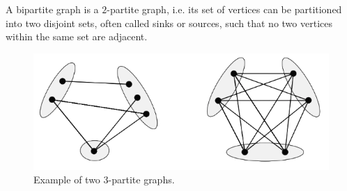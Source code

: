 \documentclass[10pt,a4paper]{book}
\numberwithin{equation}{chapter}
\numberwithin{figure}{chapter}
\numberwithin{table}{chapter}
\begin{document}
A bipartite graph is a $2$-partite graph, i.e. its set of vertices can be partitioned into two disjoint sets, often called sinks or sources, such that no two vertices within the same set are adjacent.
\begin{figure}[H]
    \begin{center}
        \includegraphics[scale=0.5]{Imagen3.png}
    \end{center}
    \caption{\footnotesize Example of two $3$-partite graphs.}
    \label{fig3}
\end{figure}
\end{document}
